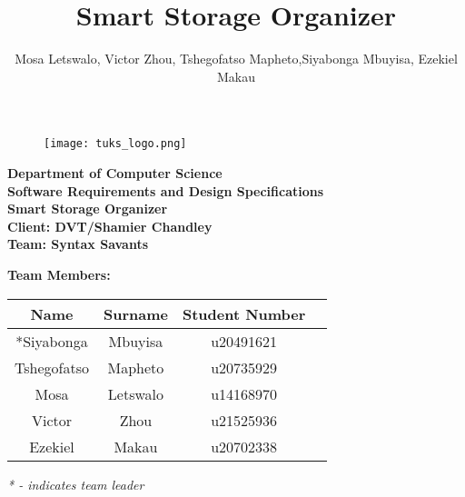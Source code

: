 \documentclass[hidelinks, 12pt, a4paper]{article}
\title{Smart Storage Organizer}
\author{Mosa Letswalo, Victor Zhou, Tshegofatso Mapheto,Siyabonga Mbuyisa, Ezekiel Makau }
\begin{document}
\begin{titlepage}
\begin{figure}
    \centering\texttt{[image: tuks\_logo.png]}
\end{figure}
\vspace{5mm}

\begin{Large}
 \begin{center}
	\textbf{Department of Computer Science}\\
	\vspace{8mm}
    \textbf{Software Requirements and Design Specifications}\\
	\vspace{8mm}
	{\huge{\bf Smart Storage Organizer}}\\
	\textbf{Client: DVT/Shamier Chandley}\\
	\vspace{8mm}
	{\huge{\bf Team: Syntax Savants}}

	\textbf{Team Members: }

    \begin{table}[h]
        \centering
        \begin{tabular}{|c|c|c|c|}

            \hline
            Name        &     Surname   &   Student Number  \\ \hline
            *Siyabonga     &     Mbuyisa     &  u20491621  \\ \hline
            Tshegofatso      &    Mapheto   &  u20735929        \\ \hline
            Mosa        &   Letswalo    &   u14168970      \\ \hline
            Victor     &    Zhou       &   u21525936       \\\hline
            Ezekiel    &   Makau   &   u20702338       \\ \hline
        \end{tabular}
    \end{table}
    \textit{* - indicates team leader}
\end{center}
\end{Large}
\end{titlepage}

\setcounter{tocdepth}{4}
\setcounter{secnumdepth}{4}
\tableofcontents
\end{document}
